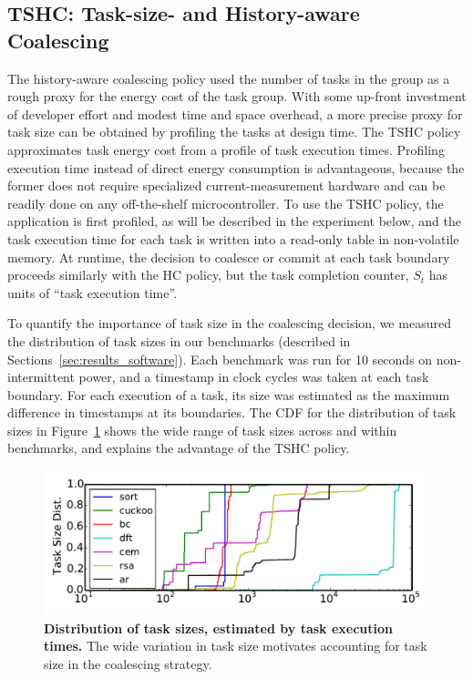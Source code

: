 \subsection{TSHC: Task-size- and History-aware Coalescing}

The history-aware coalescing policy used the number of tasks in the group as a
rough proxy for the energy cost of the task group.
%
With some up-front investment of developer effort and modest time and space
overhead, a more precise proxy for task size can be obtained by profiling the
tasks at design time.
%
The TSHC policy approximates task energy cost from a profile of task execution
times.
%
Profiling execution time instead of direct energy consumption is
advantageous, because the former does not require specialized
current\hyp{}measurement hardware and can be readily done on any
off-the-shelf microcontroller.
%
To use the TSHC policy, the application is first profiled, as will be described
in the experiment below, and the task execution time for each task is written
into a read-only table in non-volatile memory.
%
At runtime, the decision to coalesce or commit at each task boundary proceeds
similarly with the HC policy, but the task completion counter, $S_t$ has units
of ``task execution time''.

To quantify the importance of task size in the coalescing decision, we measured
the distribution of task sizes in our benchmarks (described in
Sections~\ref{sec:results_software}).
%
Each benchmark was run for 10 seconds on non-intermittent power, and a timestamp
in clock cycles was taken at each task boundary. For each execution of
a task, its size was estimated as the maximum difference in timestamps at its
boundaries.
%
The CDF for the distribution of task sizes in Figure~\ref{fig:task_profiling}
shows the wide range of task sizes across and within benchmarks, and explains
the advantage of the TSHC policy.


\begin{figure}
	\centering
	\includegraphics[width=\columnwidth]{figures/TskDist.pdf}%
	\caption{\textbf{Distribution of task sizes, estimated by task execution times.} The wide variation in task size motivates accounting for task size in the coalescing strategy.}
	\label{fig:task_profiling}
\end{figure}


